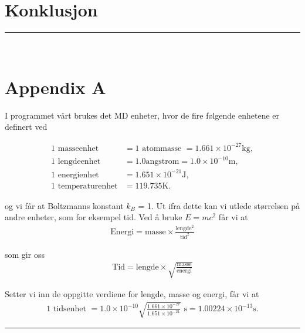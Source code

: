 \documentclass[paper=a4, fontsize=11pt]{scrartcl} %
\numberwithin{equation}{section} %
\numberwithin{figure}{section} %
\numberwithin{table}{section} %
\newcommand{\horrule}[1]{\rule{\linewidth}{#1}} %
\begin{document}
\section{Konklusjon}



\horrule{2pt} \\[0.5cm] %

\section{Appendix A}
I programmet vårt brukes det MD enheter, hvor de fire følgende enhetene er definert ved

\begin{align}
	\text{1 masseenhet } &= 1 \text{ atommasse } = 1.661\times 10^{-27}\mathrm{kg},\\
	\text{1 lengdeenhet } &= 1.0 \mathrm{angstrom} = 1.0\times 10^{-10}\mathrm{m},\\
	\text{1 energienhet } &= 1.651\times 10^{-21}\mathrm{J},\\
	\text{1 temperaturenhet} &= 119.735\mathrm{K}.
\end{align}

og vi får at Boltzmanns konstant $k_B$ = 1. Ut ifra dette kan vi utlede størrelsen på andre enheter, som for eksempel tid. Ved å bruke $E = mc^2$ får vi at
\begin{align}
\text{Energi} = \text{masse} \times \frac{\text{lengde}^2}{\text{tid}^2}
\end{align}

som gir oss 
\begin{align}
\text{Tid} = \text{lengde} \times \sqrt{\frac{\text{masse}}{\text{energi}}}
\end{align}

Setter vi inn de oppgitte verdiene for lengde, masse og energi, får vi at
\begin{align}
\text{1 tidsenhet } = 1.0 \times 10^{-10}\sqrt{\frac{1.661\times 10^{-27}}{1.651\times 10^{-21}}} \text{ s} = 1.00224\times 10^{-13}\mathrm{s}.
\end{align}

\horrule{2pt} \\[0.5cm] %
\end{document}
